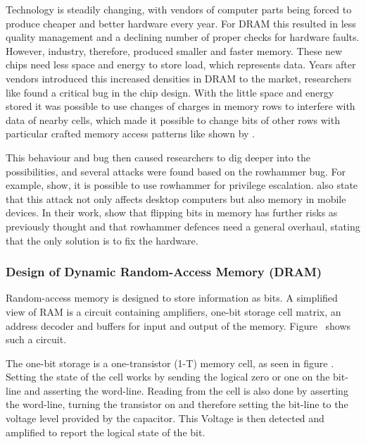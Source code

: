 Technology is steadily changing, with vendors of computer parts being forced to
produce cheaper and better hardware every year. For DRAM this resulted in less
quality management and a declining number of proper checks for hardware faults.
However, industry, therefore, produced smaller and faster memory. These new
chips need less space and energy to store load, which represents data. Years
after vendors introduced this increased densities in DRAM to the market,
researchers like  found a critical bug in the chip
design. With the little space and energy stored it was possible to use changes
of charges in memory rows to interfere with data of nearby cells, which made it
possible to change bits of other rows with particular crafted memory access
patterns like shown by .

This behaviour and bug then caused researchers to dig deeper into the
possibilities, and several attacks were found based on the rowhammer bug. For
example,  show, it is possible
to use rowhammer for privilege escalation.  also state
that this attack not only affects desktop computers but also memory in mobile
devices. In their work,  show that
flipping bits in memory has further risks as previously thought and that
rowhammer defences need a general overhaul, stating that the only solution is to
fix the hardware.

\subsubsection{Design of Dynamic Random-Access Memory (DRAM)}

Random-access memory is designed to store information as bits. A simplified view
of RAM is a circuit containing amplifiers, one-bit storage cell matrix, an
address decoder and buffers for input and output of the memory.
Figure~ shows such a circuit.

The one-bit storage is a one-transistor (1-T) memory cell, as seen in figure
. Setting the state of the cell works by sending the logical
zero or one on the bit-line and asserting the word-line. Reading from the cell
is also done by asserting the word-line, turning the transistor on and therefore
setting the bit-line to the voltage level provided by the capacitor. This
Voltage is then detected and amplified to report the logical state of the bit.

